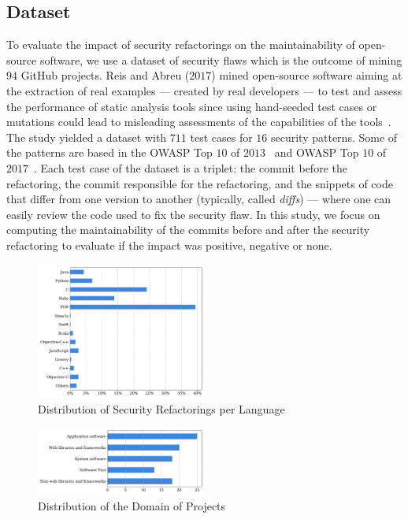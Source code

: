 \documentclass[sigconf,review]{acmart}
\begin{document}
\subsection{Dataset}
%
To evaluate the impact of security refactorings on the maintainability of
open-source software, we use a dataset of security flaws which is the outcome of
mining $94$ GitHub projects. Reis and Abreu ($2017$) mined open-source
software aiming at the extraction of real examples --- created by real
developers --- to test and assess the performance of static analysis tools since
using hand-seeded test cases or mutations could lead to misleading assessments
of the capabilities of the tools~\cite{just2014mutants}. The study yielded a
dataset with $711$ test cases for $16$ security patterns. Some of the patterns
are based in the OWASP Top $10$ of $2013$~\cite{oswap:2013} and OWASP Top $10$ of
$2017$~\cite{oswap:2017}. Each test case of the
dataset is a triplet: the commit before the refactoring, the commit responsible
for the refactoring, and the snippets of code that differ from one version to
another (typically, called \textit{diffs}) --- where one can easily review the
code used to fix the security flaw. In this study, we focus on computing the
maintainability of the commits before and after the security refactoring to
evaluate if the impact was positive, negative or none.
\vspace{-0.2cm}

\begin{figure}[h]
 	\centering 	\includegraphics[width=0.5\textwidth]{figures/language_dist.pdf}
 	\caption{Distribution of Security Refactorings per Language}
	\label{fig:lang}
\end{figure}
\vspace{-0.2cm}

\begin{figure}[h]
 	\centering 	\includegraphics[width=0.5\textwidth]{figures/type_dist.pdf}
 	\caption{Distribution of the Domain of Projects}
	\label{fig:domain}
\end{figure}
\end{document}
